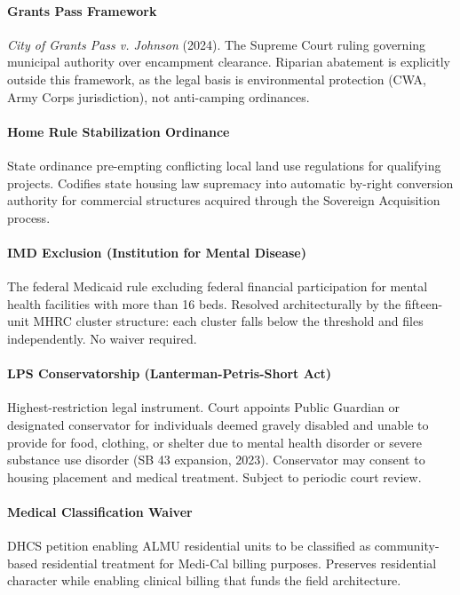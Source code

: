 {\paragraph{Grants Pass Framework} \textit{City of Grants Pass v. Johnson} (2024). The Supreme Court ruling governing municipal authority over encampment clearance. Riparian abatement is explicitly outside this framework, as the legal basis is environmental protection (CWA, Army Corps jurisdiction), not anti-camping ordinances.

\paragraph{Home Rule Stabilization Ordinance} State ordinance pre-empting conflicting local land use regulations for qualifying projects. Codifies state housing law supremacy into automatic by-right conversion authority for commercial structures acquired through the Sovereign Acquisition process.

\paragraph{IMD Exclusion (Institution for Mental Disease)} The federal Medicaid rule excluding federal financial participation for mental health facilities with more than 16 beds. Resolved architecturally by the fifteen-unit MHRC cluster structure: each cluster falls below the threshold and files independently. No waiver required.

\paragraph{LPS Conservatorship (Lanterman-Petris-Short Act)} Highest-restriction legal instrument. Court appoints Public Guardian or designated conservator for individuals deemed gravely disabled and unable to provide for food, clothing, or shelter due to mental health disorder or severe substance use disorder (SB 43 expansion, 2023). Conservator may consent to housing placement and medical treatment. Subject to periodic court review.

\paragraph{Medical Classification Waiver} DHCS petition enabling ALMU residential units to be classified as community-based residential treatment for Medi-Cal billing purposes. Preserves residential character while enabling clinical billing that funds the field architecture.

}
